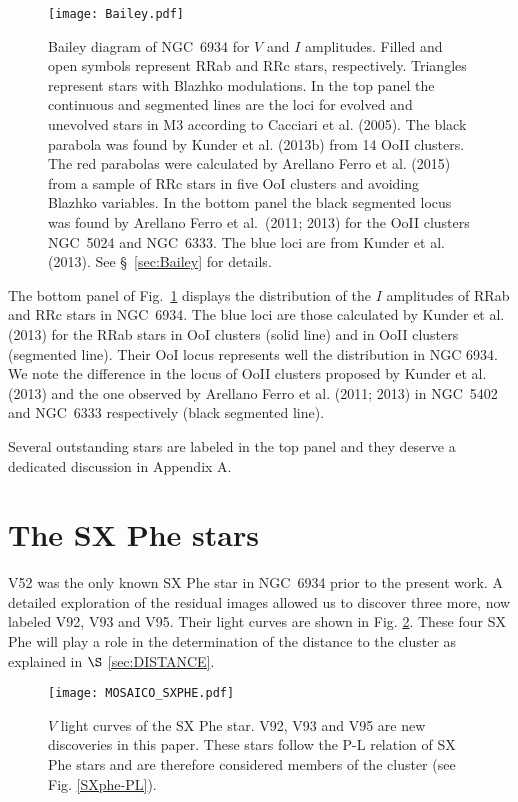 \documentclass[journal]{rmaa}
\newcommand{\1}{\'{\i}}
\begin{document}
\begin{figure}
\texttt{[image: Bailey.pdf]}
\caption{Bailey diagram of NGC~6934 for $V$ and $I$ amplitudes. Filled and open
symbols represent RRab and RRc
stars, respectively. Triangles represent stars with Blazhko modulations. In the
top panel the continuous and segmented lines are the loci for evolved and unevolved
stars in M3 according to Cacciari et al. (2005). The black parabola was found by
Kunder et al. (2013b) from 14 OoII clusters. The red parabolas were calculated by
Arellano Ferro et al. (2015) from a sample of RRc stars in five OoI clusters and
avoiding Blazhko variables. In the bottom panel the black segmented locus was found
by Arellano Ferro et al.\ (2011; 2013) for the OoII clusters NGC~5024 and NGC~6333.
The blue loci are from Kunder et al. (2013). See \S~\ref{sec:Bailey} for details.}
    \label{Fig:Bailey}
\end{figure}

The bottom panel of Fig.~\ref{Fig:Bailey} displays the distribution of the $I$
amplitudes of RRab and RRc stars in NGC~6934.
The blue loci are those calculated by Kunder et al. (2013) for the RRab stars
in OoI clusters (solid line) and in OoII
clusters (segmented line). Their OoI locus represents well the
distribution in NGC 6934. We note the difference in the locus of OoII
clusters proposed by Kunder et al. (2013) and the one observed by Arellano Ferro et
al. (2011; 2013) in NGC~5402 and NGC~6333 respectively (black segmented line).

Several outstanding stars are labeled in the top panel and they deserve a
dedicated discussion in Appendix A.


\section{The SX Phe stars}
\label{Sec:SXPHE}

V52 was the only known SX Phe star in NGC~6934 prior to the present work.  A detailed exploration of the
residual images allowed us to discover three more, now labeled V92, V93 and V95. Their light curves are shown in Fig. \ref{SXphe}.
These four SX Phe will play a role in the determination of the distance to the cluster as explained in
$\S$ \ref{sec:DISTANCE}.

\begin{figure}
\texttt{[image: MOSAICO\_SXPHE.pdf]}
\caption{$V$ light curves of the SX Phe star. V92, V93 and V95 are
new discoveries in this paper. These stars follow the P-L relation of SX Phe stars
and are therefore considered members of the cluster (see Fig. \ref{SXphe-PL}).}
    \label{SXphe}
\end{figure}
\end{document}
